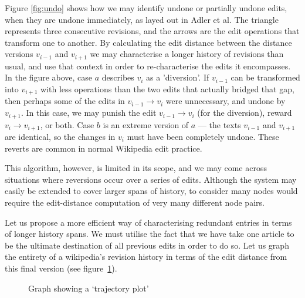 Figure \ref{fig:undo} shows how we may identify undone or partially
undone edits, when they are undone immediately, as layed out in Adler
et al.\cite{Adler2007} The triangle represents three consecutive
revisions, and the arrows are the edit operations that transform one
to another. By calculating the edit distance between the distance
versions $v_{i-1}$ and $v_{i+1}$ we may characterise a longer history
of revisions than usual, and use that context in order to
re-characterise the edits it encompasses. In the figure above, case
$a$ describes $v_i$ as a 'diversion'. If $v_{i-1}$ can be transformed
into $v_{i+1}$ with less operations than the two edits that actually
bridged that gap, then perhaps some of the edits in $v_{i-1}
\rightarrow v_i$ were unnecessary, and undone by $v_{i+1}$. In this
case, we may punish the edit $v_{i-1} \rightarrow v_i$ (for the
diversion), reward $v_{i} \rightarrow v_{i+1}$, or both. Case $b$ is
an extreme version of $a$ --- the texts $v_{i-1}$ and $v_{i+1}$ are
identical, so the changes in $v_i$ must have been completely
undone. These reverts are common in normal Wikipedia edit
practice.\cite{wiki-revert}

This algorithm, however, is limited in its scope, and we may
come across situations where reversions occur over a series of
edits. Although the system may easily be extended to cover
larger spans of history, to consider many nodes would require
the edit-distance computation of very many different node
pairs. 

Let us propose a more efficient way of characterising redundant
entries in terms of longer history spans. We must utilise the fact
that we have take one article to be the ultimate destination of all
previous edits in order to do so. Let us graph the entirety of a
wikipedia's revision history in terms of the edit distance from this
final version (see figure~\ref{fig:dummy-history}).

\begin{figure}
  \centering
  \pgfplotsset{width=0.4\textwidth}
  \caption{Graph showing a `trajectory plot'}
  \label{fig:dummy-history}
\end{figure}

